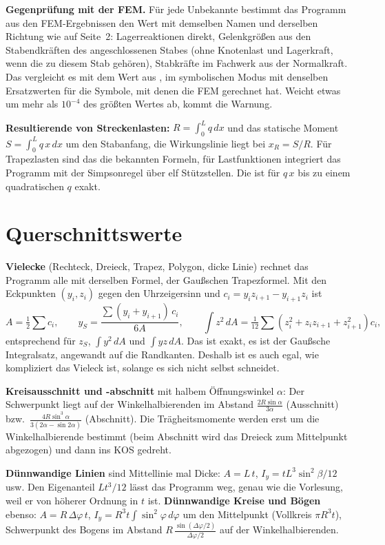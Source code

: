 \textbf{Gegenprüfung mit der FEM.} Für jede Unbekannte bestimmt das Programm aus den FEM-Ergebnissen
den Wert mit demselben Namen und derselben Richtung wie auf Seite~2: Lagerreaktionen direkt,
Gelenkgrößen aus den Stabendkräften des angeschlossenen Stabes (ohne Knotenlast und Lagerkraft, wenn
die zu diesem Stab gehören), Stabkräfte im Fachwerk aus der Normalkraft. Das vergleicht es mit dem
Wert aus , im symbolischen Modus mit denselben Ersatzwerten für die Symbole, mit denen
die FEM gerechnet hat. Weicht etwas um mehr als $10^{-4}$ des größten Wertes ab, kommt die Warnung.

\textbf{Resultierende von Streckenlasten:} $R = \int_0^L q\,dx$ und das statische Moment
$S = \int_0^L q\,x\,dx$ um den Stabanfang, die Wirkungslinie liegt bei $x_R = S/R$. Für Trapezlasten
sind das die bekannten Formeln, für Lastfunktionen integriert das Programm mit der Simpsonregel
über elf Stützstellen. Die ist für $q\,x$ bis zu einem quadratischen $q$ exakt.

\section{Querschnittswerte}\label{sec:mathe-qswerte}

\textbf{Vielecke} (Rechteck, Dreieck, Trapez, Polygon, dicke Linie) rechnet das Programm alle mit
derselben Formel, der Gaußschen Trapezformel. Mit den Eckpunkten $(y_i, z_i)$ gegen den
Uhrzeigersinn und $c_i = y_i z_{i+1} - y_{i+1} z_i$ ist
\[
  A = \tfrac12 \sum c_i, \qquad
  y_S = \frac{\sum (y_i + y_{i+1})\,c_i}{6A}, \qquad
  \int z^2\,dA = \tfrac1{12} \sum \left(z_i^2 + z_i z_{i+1} + z_{i+1}^2\right) c_i ,
\]
entsprechend für $z_S$, $\int y^2\,dA$ und $\int yz\,dA$. Das ist exakt, es ist der Gaußsche
Integralsatz, angewandt auf die Randkanten. Deshalb ist es auch egal, wie kompliziert das Vieleck
ist, solange es sich nicht selbst schneidet.

\textbf{Kreisausschnitt und -abschnitt} mit halbem Öffnungswinkel $\alpha$: Der Schwerpunkt liegt
auf der Winkelhalbierenden im Abstand $\frac{2R\sin\alpha}{3\alpha}$ (Ausschnitt) bzw.\
$\frac{4R\sin^3\alpha}{3(2\alpha - \sin 2\alpha)}$ (Abschnitt). Die Trägheitsmomente werden erst um
die Winkelhalbierende bestimmt (beim Abschnitt wird das Dreieck zum Mittelpunkt abgezogen) und dann
ins KOS gedreht.

\textbf{Dünnwandige Linien} sind Mittellinie mal Dicke: $A = L\,t$,
$I_y = t L^3 \sin^2\beta/12$ usw. Den Eigenanteil $L t^3/12$ lässt das Programm weg, genau wie
die Vorlesung, weil er von höherer Ordnung in $t$ ist. \textbf{Dünnwandige Kreise und Bögen}
ebenso: $A = R\,\Delta\varphi\,t$, $I_y = R^3 t \int \sin^2\varphi\,d\varphi$ um den Mittelpunkt
(Vollkreis $\pi R^3 t$), Schwerpunkt des Bogens im Abstand $R\,\frac{\sin(\Delta\varphi/2)}{\Delta\varphi/2}$
auf der Winkelhalbierenden.

